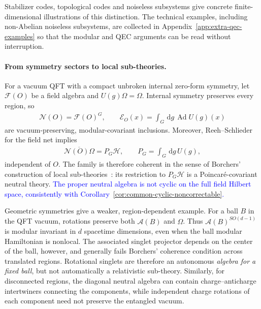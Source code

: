 \documentclass[a4paper,11pt]{article}
\theoremstyle{definition}
\newcommand{\dd}{\,\mathrm{d}}
\newcommand{\cH}{\mathcal{H}}
\newcommand{\mN}{\mathcal{N}}
\newcommand{\NL}[1]{\textcolor{blue}{#1}}
\newcommand{\mE}{\mathcal{E}}
\begin{document}
Stabilizer codes, topological codes and noiseless subsystems give concrete finite-dimensional illustrations of this distinction. The technical examples, including non-Abelian noiseless subsystems, are collected in Appendix~\ref{app:extra-qec-examples} so that the modular and QEC arguments can be read without interruption.

\paragraph{From symmetry sectors to local sub-theories.}
For a vacuum QFT with a compact unbroken internal zero-form symmetry,
let $\mathcal F(O)$ be a field algebra and $U(g)\Omega=\Omega$. Internal
symmetry preserves every region, so
\begin{align}
 \mN(O)=\mathcal F(O)^G,\qquad
 \mE_O(x)=\int_G\dd g\,\operatorname{Ad}U(g)(x)
 \label{eq:internal-neutral-net}
\end{align}
are vacuum-preserving, modular-covariant inclusions. Moreover,
Reeh--Schlieder for the field net implies
\begin{align}
 \overline{\mN(O)\Omega}=P_G\cH,
 \qquad P_G=\int_G\dd g\,U(g),
 \label{eq:internal-coherent-projection}
\end{align}
independent of $O$. The family is therefore coherent in the sense of
Borchers' construction of local sub-theories~\cite{revolutionizing}:
its restriction to $P_G\cH$ is a Poincar\'e-covariant neutral theory.
\NL{The proper neutral algebra is not cyclic on the full field Hilbert space, consistently with Corollary~\ref{cor:common-cyclic-noncorrectable}.}

Geometric symmetries give a weaker, region-dependent example. For a
ball $B$ in the QFT vacuum, rotations preserve both $\mathcal A(B)$ and
$\Omega$. Thus $\mathcal A(B)^{SO(d-1)}$ is modular invariant in
$d$ spacetime dimensions, even when the ball modular Hamiltonian is
nonlocal. The associated singlet projector depends on the center of the
ball, however, and generally fails Borchers' coherence condition across
translated regions. Rotational singlets are therefore an autonomous
\emph{algebra for a fixed ball}, but not automatically a relativistic
sub-theory. Similarly, for disconnected regions, the diagonal neutral
algebra can contain charge--anticharge intertwiners connecting the
components, while independent charge rotations of each component need
not preserve the entangled vacuum.
\end{document}
